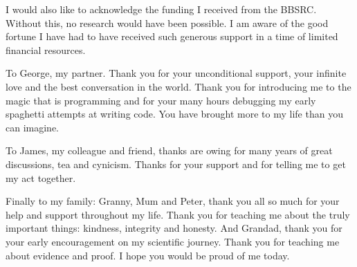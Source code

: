 I would also like to acknowledge the funding I received from the BBSRC. Without this, no research would have been possible. I am aware of the good fortune I have had to have received such generous support in a time of limited financial resources.

To George, my partner. Thank you for your unconditional support, your infinite love and the best conversation in the world. Thank you for introducing me to the magic that is programming and for your many hours debugging my early spaghetti attempts at writing code. You have brought more to my life than you can imagine.

To James, my colleague and friend, thanks are owing for many years of great discussions, tea and cynicism. Thanks for your support and for telling me to get my act together.

Finally to my family: Granny, Mum and Peter, thank you all so much for your help and support throughout my life. Thank you for teaching me about the truly important things: kindness, integrity and honesty. And Grandad, thank you for your early encouragement on my scientific journey. Thank you for teaching me about evidence and proof. I hope you would be proud of me today. 